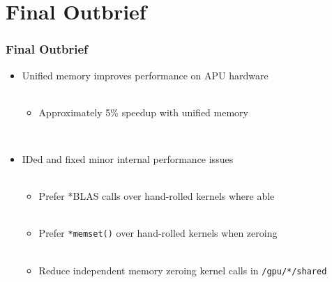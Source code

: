 \documentclass{beamer}
\begin{document}
\section{Final Outbrief}

\begin{frame}
\begin{center}
\frametitle{Final Outbrief}

\begin{itemize}

\item Unified memory improves performance on APU hardware\\

~\\

\begin{itemize}

\item Approximately 5\% speedup with unified memory\\

\end{itemize}

~\\

\item IDed and fixed minor internal performance issues\\

~\\

\begin{itemize}

\item Prefer *BLAS calls over hand-rolled kernels where able\\

~\\

\item Prefer \lstinline{*memset()} over hand-rolled kernels when zeroing\\

~\\

\item Reduce independent memory zeroing kernel calls in \lstinline{/gpu/*/shared}\\

\end{itemize}

~\\


\end{itemize}
\end{center}
\end{frame}
\end{document}
